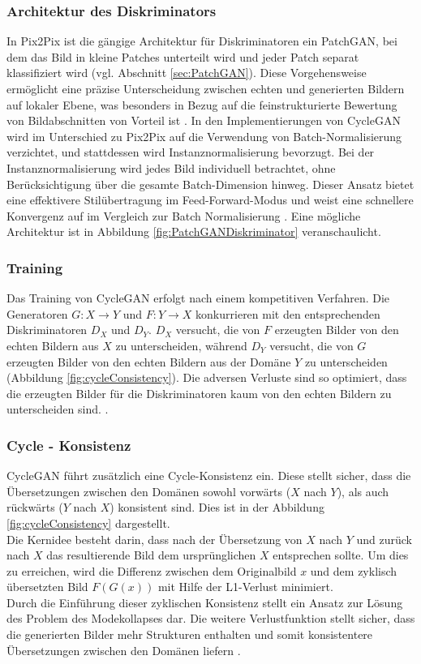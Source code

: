 \subsubsection{Architektur des Diskriminators}
In Pix2Pix ist die gängige Architektur für Diskriminatoren ein PatchGAN, bei dem das Bild in kleine Patches unterteilt wird und jeder Patch separat klassifiziert wird (vgl. Abschnitt \ref{sec:PatchGAN}). Diese Vorgehensweise ermöglicht eine präzise Unterscheidung zwischen echten und generierten Bildern auf lokaler Ebene, was besonders in Bezug auf die feinstrukturierte Bewertung von Bildabschnitten von Vorteil ist \cite{Zhu.2017}.
\newline
In den Implementierungen von CycleGAN wird im Unterschied zu Pix2Pix auf die Verwendung von Batch-Normalisierung verzichtet, und stattdessen wird Instanznormalisierung bevorzugt. Bei der Instanznormalisierung wird jedes Bild individuell betrachtet, ohne Berücksichtigung über die gesamte Batch-Dimension hinweg. Dieser Ansatz bietet eine effektivere Stilübertragung im Feed-Forward-Modus und weist eine schnellere Konvergenz auf im Vergleich zur Batch Normalisierung \cite{Huang.2017}. Eine mögliche Architektur ist in Abbildung \ref{fig:PatchGANDiskriminator} veranschaulicht.

\subsubsection{Training}
Das Training von CycleGAN erfolgt nach einem kompetitiven Verfahren. Die Generatoren $G:X\rightarrow Y$ und $F:Y\rightarrow X$ konkurrieren mit den entsprechenden Diskriminatoren $D_X$ und $D_Y$. $D_X$ versucht, die von $F$ erzeugten Bilder von den echten Bildern aus $X$ zu unterscheiden, während $D_Y$ versucht, die von $G$ erzeugten Bilder von den echten Bildern aus der Domäne $Y$ zu unterscheiden (Abbildung \ref{fig:cycleConsistency}). Die adversen Verluste sind so optimiert, dass die erzeugten Bilder für die Diskriminatoren kaum von den echten Bildern zu unterscheiden sind. \cite{Zhu.2017}.

\subsubsection{Cycle - Konsistenz}
CycleGAN führt zusätzlich eine Cycle-Konsistenz ein. Diese stellt sicher, dass die Übersetzungen zwischen den Domänen sowohl vorwärts ($X$ nach $Y$), als auch rückwärts ($Y$ nach $X$) konsistent sind. Dies ist in der Abbildung \ref{fig:cycleConsistency} dargestellt.
\\
Die Kernidee besteht darin, dass nach der Übersetzung von $X$ nach $Y$ und zurück nach $X$ das resultierende Bild dem ursprünglichen $X$ entsprechen sollte. Um dies zu erreichen, wird die Differenz zwischen dem Originalbild $x$ und dem zyklisch übersetzten Bild $F(G(x))$ mit Hilfe der L1-Verlust minimiert. 
\\
Durch die Einführung dieser zyklischen Konsistenz stellt ein Ansatz zur Lösung des Problem des Modekollapses dar. Die weitere Verlustfunktion stellt sicher, dass die generierten Bilder mehr Strukturen enthalten und somit konsistentere Übersetzungen zwischen den Domänen liefern \cite{Zhu.2017}.

